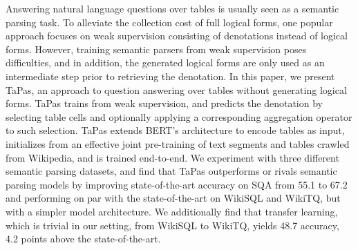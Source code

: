 Answering natural language questions over tables is usually seen as a semantic parsing task. To alleviate the collection cost of full logical forms, one popular approach focuses on weak supervision consisting of denotations instead of logical forms. However, training semantic parsers from weak supervision poses difficulties, and in addition, the generated logical forms are only used as an intermediate step prior to retrieving the denotation. In this paper, we present TaPas, an approach to question answering over tables without generating logical forms. TaPas trains from weak supervision, and predicts the denotation by selecting table cells and optionally applying a corresponding aggregation operator to such selection. TaPas extends BERT's architecture to encode tables as input, initializes from an effective joint pre-training of text segments and tables crawled from Wikipedia, and is trained end-to-end. We experiment with three different semantic parsing datasets, and find that TaPas outperforms or rivals semantic parsing models by improving state-of-the-art accuracy on SQA from 55.1 to 67.2 and performing on par with the state-of-the-art on WikiSQL and WikiTQ, but with a simpler model architecture. We additionally find that transfer learning, which is trivial in our setting, from WikiSQL to WikiTQ, yields 48.7 accuracy, 4.2 points above the state-of-the-art.
